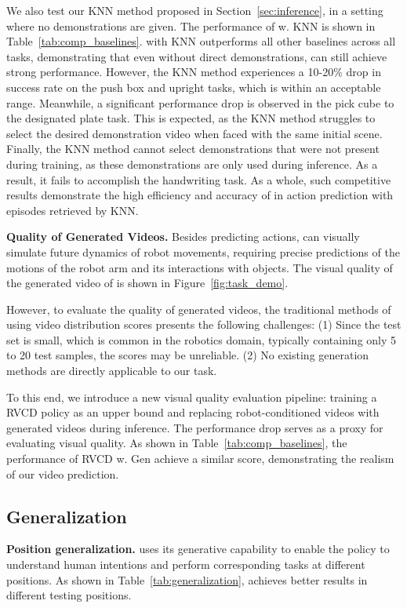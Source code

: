 We also test our KNN method proposed in Section~\ref{sec:inference}, in a setting where no demonstrations are given. The performance of \system w. KNN is shown in Table~\ref{tab:comp_baselines}. \system with KNN outperforms all other baselines across all tasks, demonstrating that even without direct demonstrations, \system can still achieve strong performance. However, the KNN method experiences a 10-20\% drop in success rate on the push box and upright tasks, which is within an acceptable range. Meanwhile, a significant performance drop is observed in the pick cube to the designated plate task. This is expected, as the KNN method struggles to select the desired demonstration video when faced with the same initial scene. Finally, the KNN method cannot select demonstrations that were not present during training, as these demonstrations are only used during inference. As a result, it fails to accomplish the handwriting task. As a whole, such competitive results demonstrate the high efficiency and accuracy of \system in action prediction with episodes retrieved by KNN.

\noindent\textbf{Quality of Generated Videos.} Besides predicting actions, \system can visually simulate future dynamics of robot movements, requiring precise predictions of the motions of the robot arm and its interactions with objects. The visual quality of the generated video of \system is shown in Figure~\ref{fig:task_demo}.

However, to evaluate the quality of generated videos, the traditional methods of using video distribution scores presents the following challenges: (1) Since the test set is small, which is common in the robotics domain, typically containing only 5 to 20 test samples, the scores may be unreliable. (2) No existing generation methods are directly applicable to our task.

To this end, we introduce a new visual quality evaluation pipeline: training a RVCD policy as an upper bound and replacing robot-conditioned videos with generated videos during inference. The performance drop serves as a proxy for evaluating visual quality. As shown in Table~\ref{tab:comp_baselines}, the performance of RVCD w. Gen achieve a similar score, demonstrating the realism of our video prediction.

\subsection{Generalization}

\noindent\textbf{Position generalization.} \system uses its generative capability to enable the policy to understand human intentions and perform corresponding tasks at different positions. As shown in Table~\ref{tab:generalization}, \system achieves better results in different testing positions.

